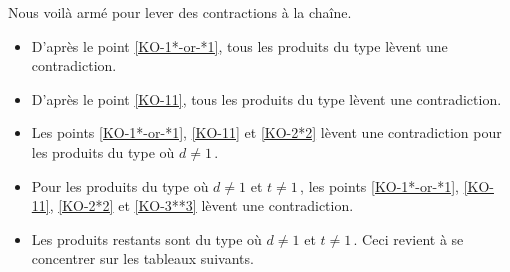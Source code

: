 \smallskip

Nous voilà armé pour lever des contractions à la chaîne.

\begin{itemize}
	\item D'après le point \ref{KO-1*-or-*1}, tous les produits du type  lèvent une contradiction.
	


	\item D'après le point \ref{KO-11}, tous les produits du type  lèvent une contradiction.
	


	\item Les points \ref{KO-1*-or-*1}, \ref{KO-11} et \ref{KO-2*2} lèvent une contradiction pour les produits du type  où $d \neq 1$\,.
	


	\item Pour les produits du type  où $d \neq 1$ et $t \neq 1$\,, les points \ref{KO-1*-or-*1}, \ref{KO-11}, \ref{KO-2*2} et \ref{KO-3**3} lèvent une contradiction.
	


	\item Les produits restants sont du type  où $d \neq 1$ et $t \neq 1$\,. Ceci revient à se concentrer sur les tableaux suivants.
\end{itemize}

